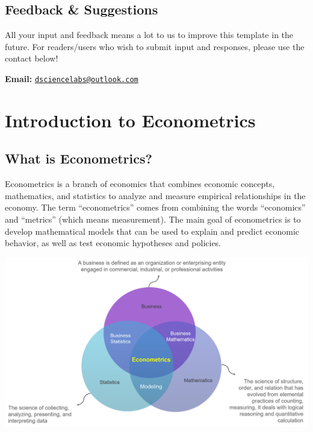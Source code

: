 \documentclass[
]{book}
\begin{document}
\hypertarget{feedback-suggestions}{%
\section*{Feedback \& Suggestions}\label{feedback-suggestions}}

All your input and feedback means a lot to us to improve this template in the future. For readers/users who wish to submit input and responses, please use the contact below!

\textbf{Email:} \href{mailto:dsciencelabs@outlook.com}{\nolinkurl{dsciencelabs@outlook.com}}

\hypertarget{introduction-to-econometrics}{%
\chapter{Introduction to Econometrics}\label{introduction-to-econometrics}}

\hypertarget{what-is-econometrics}{%
\section{What is Econometrics?}\label{what-is-econometrics}}

Econometrics is a branch of economics that combines economic concepts, mathematics, and statistics to analyze and measure empirical relationships in the economy. The term ``econometrics'' comes from combining the words ``economics'' and ``metrics'' (which means measurement). The main goal of econometrics is to develop mathematical models that can be used to explain and predict economic behavior, as well as test economic hypotheses and policies.

\begin{center}\includegraphics[width=1\linewidth]{images/Bab1/econometrics} \end{center}
\end{document}
